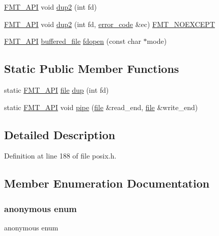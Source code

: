 \begin{DoxyCompactItemize}
\item 
\hyperlink{core_8h_a9a4960b70582ed2620911a0b75dce0b5}{F\+M\+T\+\_\+\+A\+PI} void \hyperlink{classfile_a5438e03088d3b7792a7bf0c2af581e7d}{dup2} (int fd)
\item 
\hyperlink{core_8h_a9a4960b70582ed2620911a0b75dce0b5}{F\+M\+T\+\_\+\+A\+PI} void \hyperlink{classfile_afcd00b59adb3e06540627960832a164c}{dup2} (int fd, \hyperlink{classerror__code}{error\+\_\+code} \&ec) \hyperlink{core_8h_aef128913e8400683b1cbd1a3a2e11df3}{F\+M\+T\+\_\+\+N\+O\+E\+X\+C\+E\+PT}
\item 
\hyperlink{core_8h_a9a4960b70582ed2620911a0b75dce0b5}{F\+M\+T\+\_\+\+A\+PI} \hyperlink{classbuffered__file}{buffered\+\_\+file} \hyperlink{classfile_a8e6b39b08670ce61993ee23acfe36c80}{fdopen} (const char $\ast$mode)
\end{DoxyCompactItemize}
\subsection*{Static Public Member Functions}
\begin{DoxyCompactItemize}
\item 
static \hyperlink{core_8h_a9a4960b70582ed2620911a0b75dce0b5}{F\+M\+T\+\_\+\+A\+PI} \hyperlink{classfile}{file} \hyperlink{classfile_a68335715e12fa4a8b66390d9c875bf65}{dup} (int fd)
\item 
static \hyperlink{core_8h_a9a4960b70582ed2620911a0b75dce0b5}{F\+M\+T\+\_\+\+A\+PI} void \hyperlink{classfile_a096b53bfb1b4cd1b566ddea0d6a6f3bc}{pipe} (\hyperlink{classfile}{file} \&read\+\_\+end, \hyperlink{classfile}{file} \&write\+\_\+end)
\end{DoxyCompactItemize}


\subsection{Detailed Description}


Definition at line 188 of file posix.\+h.



\subsection{Member Enumeration Documentation}
\mbox{\label{classfile_aa84b8a1d28ab2c03182796d9435e84c3}} 
\subsubsection{\texorpdfstring{anonymous enum}{anonymous enum}}
{\footnotesize\ttfamily anonymous enum}


